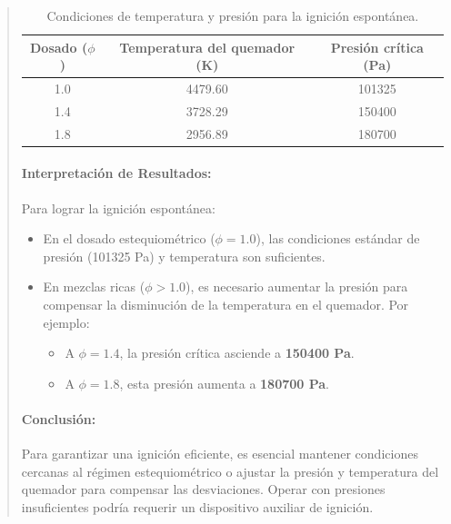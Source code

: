 \documentclass[11pt, a4paper]{article}
\begin{document}
\begin{quote}
\begin{center}
\begin{adjustwidth}{-1.7cm}{-1cm}
\begin{table}[h!]
\centering
\begin{tabular}{|c|c|c|}
\hline
\textbf{Dosado (\(\phi\))} & \textbf{Temperatura del quemador (K)} & \textbf{Presión crítica (Pa)} \\ \hline
1.0                        & 4479.60                              & 101325                        \\ \hline
1.4                        & 3728.29                              & 150400                        \\ \hline
1.8                        & 2956.89                              & 180700                        \\ \hline
\end{tabular}
\caption{Condiciones de temperatura y presión para la ignición espontánea.}
\end{table}

\paragraph{Interpretación de Resultados:}
Para lograr la ignición espontánea:
\begin{itemize}
    \item En el dosado estequiométrico (\(\phi = 1.0\)), las condiciones estándar de presión (101325 Pa) y temperatura son suficientes.
    \item En mezclas ricas (\(\phi > 1.0\)), es necesario aumentar la presión para compensar la disminución de la temperatura en el quemador. Por ejemplo:
    \begin{itemize}
        \item A \(\phi = 1.4\), la presión crítica asciende a \textbf{150400 Pa}.
        \item A \(\phi = 1.8\), esta presión aumenta a \textbf{180700 Pa}.
    \end{itemize}
\end{itemize}

\paragraph{Conclusión:}
Para garantizar una ignición eficiente, es esencial mantener condiciones cercanas al régimen estequiométrico o ajustar la presión y temperatura del quemador para compensar las desviaciones. Operar con presiones insuficientes podría requerir un dispositivo auxiliar de ignición.


\newpage
\begin{quote}
\setlength{\parskip}{1pt} %
\vspace*{0.3cm} %
\hypertarget{recirculacion}{%
}
\end{quote}
\end{adjustwidth}
\end{center}
\end{quote}
\end{document}
